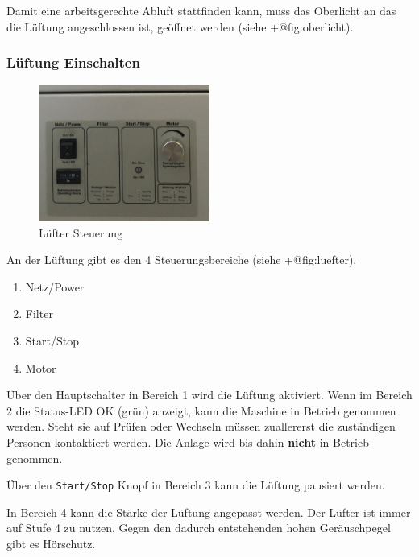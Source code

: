 \documentclass[]{article}
\providecommand{\tightlist}{%
  \setlength{\itemsep}{0pt}\setlength{\parskip}{0pt}}
\begin{document}
Damit eine arbeitsgerechte Abluft stattfinden kann, muss das Oberlicht
an das die Lüftung angeschlossen ist, geöffnet werden (siehe
+@fig:oberlicht).

\hypertarget{luxfcftung-einschalten}{%
\subsubsection{Lüftung Einschalten}\label{luxfcftung-einschalten}}

\begin{figure}
\hypertarget{fig:luefter}{%
\centering
\includegraphics[width=0.5\textwidth,height=\textheight]{./assets/images/lueftung-steuerung.jpg}
\caption{Lüfter Steuerung}\label{fig:luefter}
}
\end{figure}

An der Lüftung gibt es den 4 Steuerungsbereiche (siehe +@fig:luefter).

\begin{enumerate}
\def\labelenumi{\arabic{enumi}.}
\tightlist
\item
  Netz/Power
\item
  Filter
\item
  Start/Stop
\item
  Motor
\end{enumerate}

Über den Hauptschalter in Bereich 1 wird die Lüftung aktiviert. Wenn im
Bereich 2 die Status-LED OK (grün) anzeigt, kann die Maschine in Betrieb
genommen werden. Steht sie auf Prüfen oder Wechseln müssen zuallererst
die zuständigen Personen kontaktiert werden. Die Anlage wird bis dahin
\textbf{nicht} in Betrieb genommen.

Über den \texttt{Start/Stop} Knopf in Bereich 3 kann die Lüftung
pausiert werden.

In Bereich 4 kann die Stärke der Lüftung angepasst werden. Der Lüfter
ist immer auf Stufe 4 zu nutzen. Gegen den dadurch entstehenden hohen
Geräuschpegel gibt es Hörschutz.
\end{document}
